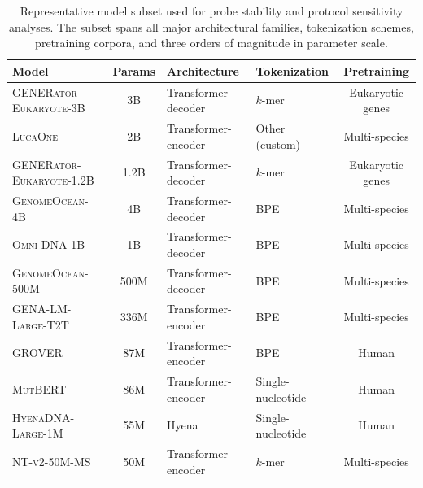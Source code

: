 \documentclass{article}
\theoremstyle{plain}
\theoremstyle{definition}
\theoremstyle{remark}
\begin{document}
\begin{table}[h]
\centering
\caption{Representative model subset used for probe stability and protocol
sensitivity analyses. The subset spans all major architectural families,
tokenization schemes, pretraining corpora, and three orders of magnitude
in parameter scale.}
\label{tab:stability_models}
\small
\begin{tabular}{@{}lcllc@{}}
\toprule
\textbf{Model} & \textbf{Params} & \textbf{Architecture} & \textbf{Tokenization} & \textbf{Pretraining} \\
\midrule
\textsc{GENERator-Eukaryote-3B}    & 3B    & Transformer-decoder & $k$-mer           & Eukaryotic genes \\
\textsc{LucaOne}                    & 2B    & Transformer-encoder & Other (custom)    & Multi-species \\
\textsc{GENERator-Eukaryote-1.2B}  & 1.2B  & Transformer-decoder & $k$-mer           & Eukaryotic genes \\
\textsc{GenomeOcean-4B}            & 4B    & Transformer-decoder & BPE               & Multi-species \\
\textsc{Omni-DNA-1B}                & 1B    & Transformer-decoder & BPE               & Multi-species \\
\textsc{GenomeOcean-500M}          & 500M  & Transformer-decoder & BPE               & Multi-species \\
\textsc{GENA-LM-Large-T2T}         & 336M  & Transformer-encoder & BPE               & Multi-species \\
\textsc{GROVER}                     & 87M   & Transformer-encoder & BPE               & Human \\
\textsc{MutBERT}                    & 86M   & Transformer-encoder & Single-nucleotide & Human \\
\textsc{HyenaDNA-Large-1M}         & 55M & Hyena               & Single-nucleotide & Human \\
\textsc{NT-v2-50M-MS}              & 50M   & Transformer-encoder & $k$-mer           & Multi-species \\
\bottomrule
\end{tabular}
\end{table}
\end{document}
